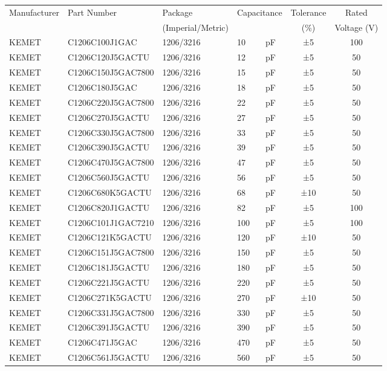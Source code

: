 \begin{tabular}{lllllcc}
Manufacturer & Part Number      & Package & \multicolumn{2}{l}{Capacitance} & Tolerance & Rated  \\
 & & (Imperial/Metric) &  & & (\%) & Voltage (V) \\
\hline
KEMET & C1206C100J1GAC     & 1206/3216 & 10  & pF & ±5  & 100 \\
KEMET & C1206C120J5GACTU   & 1206/3216 & 12  & pF & ±5  & 50  \\
KEMET & C1206C150J5GAC7800 & 1206/3216 & 15  & pF & ±5  & 50  \\
KEMET & C1206C180J5GAC     & 1206/3216 & 18  & pF & ±5  & 50  \\
KEMET & C1206C220J5GAC7800 & 1206/3216 & 22  & pF & ±5  & 50  \\
KEMET & C1206C270J5GACTU   & 1206/3216 & 27  & pF & ±5  & 50  \\
KEMET & C1206C330J5GAC7800 & 1206/3216 & 33  & pF & ±5  & 50  \\
KEMET & C1206C390J5GACTU   & 1206/3216 & 39  & pF & ±5  & 50  \\
KEMET & C1206C470J5GAC7800 & 1206/3216 & 47  & pF & ±5  & 50  \\
KEMET & C1206C560J5GACTU   & 1206/3216 & 56  & pF & ±5  & 50  \\
KEMET & C1206C680K5GACTU   & 1206/3216 & 68  & pF & ±10 & 50  \\
KEMET & C1206C820J1GACTU   & 1206/3216 & 82  & pF & ±5  & 100 \\
KEMET & C1206C101J1GAC7210 & 1206/3216 & 100 & pF & ±5  & 100 \\
KEMET & C1206C121K5GACTU   & 1206/3216 & 120 & pF & ±10 & 50  \\
KEMET & C1206C151J5GAC7800 & 1206/3216 & 150 & pF & ±5  & 50  \\
KEMET & C1206C181J5GACTU   & 1206/3216 & 180 & pF & ±5  & 50  \\
KEMET & C1206C221J5GACTU   & 1206/3216 & 220 & pF & ±5  & 50  \\
KEMET & C1206C271K5GACTU   & 1206/3216 & 270 & pF & ±10 & 50  \\
KEMET & C1206C331J5GAC7800 & 1206/3216 & 330 & pF & ±5  & 50  \\
KEMET & C1206C391J5GACTU   & 1206/3216 & 390 & pF & ±5  & 50  \\
KEMET & C1206C471J5GAC     & 1206/3216 & 470 & pF & ±5  & 50  \\
KEMET & C1206C561J5GACTU   & 1206/3216 & 560 & pF & ±5  & 50  \\

\end{tabular}
